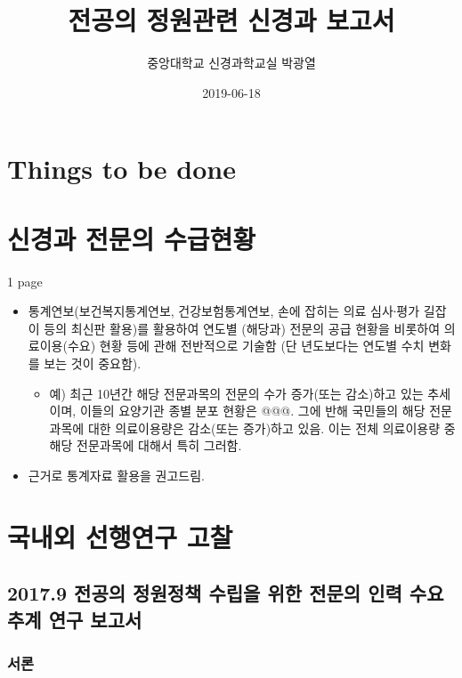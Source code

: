 \documentclass[]{book}
\title{전공의 정원관련 신경과 보고서}
\author{중앙대학교 신경과학교실 박광열}
\date{2019-06-18}
\providecommand{\tightlist}{%
  \setlength{\itemsep}{0pt}\setlength{\parskip}{0pt}}
\begin{document}
\maketitle

{
\setcounter{tocdepth}{1}
\tableofcontents
}
\hypertarget{things-to-be-done}{%
\chapter*{Things to be done}\label{things-to-be-done}}

\hypertarget{DemandSupplyNeurologist}{%
\chapter{신경과 전문의 수급현황}\label{DemandSupplyNeurologist}}

1 page

\begin{itemize}
\tightlist
\item
  통계연보(보건복지통계연보, 건강보험통계연보, 손에 잡히는 의료 심사∙평가 길잡이 등의 최신판 활용)를 활용하여 연도별 (해당과) 전문의 공급 현황을 비롯하여 의료이용(수요) 현황 등에 관해 전반적으로 기술함 (단 년도보다는 연도별 수치 변화를 보는 것이 중요함).

  \begin{itemize}
  \tightlist
  \item
    예) 최근 10년간 해당 전문과목의 전문의 수가 증가(또는 감소)하고 있는 추세이며, 이들의 요양기관 종별 분포 현황은 @@@\citet{이러함}. 그에 반해 국민들의 해당 전문과목에 대한 의료이용량은 감소(또는 증가)하고 있음. 이는 전체 의료이용량 중 해당 전문과목에 대해서 특히 그러함.
  \end{itemize}
\item
  근거로 통계자료 활용을 권고드림.
\end{itemize}

\hypertarget{section}{%
\chapter{국내외 선행연구 고찰}\label{section}}

\hypertarget{section-1}{%
\section{2017.9 전공의 정원정책 수립을 위한 전문의 인력 수요 추계 연구 보고서}\label{section-1}}

\hypertarget{section-2}{%
\subsection{서론}\label{section-2}}
\end{document}
